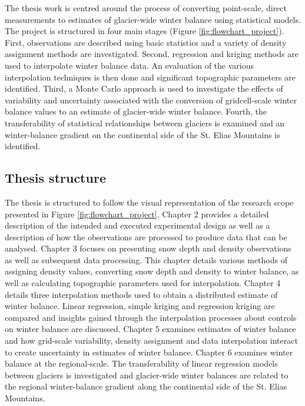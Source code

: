 \documentclass{sfuthesis}
\begin{document}
The thesis work is centred around the process of converting point-scale, direct measurements to estimates of glacier-wide winter balance using statistical models. The project is structured in four main stages (Figure \ref{fig:flowchart_project}). First, observations are described using basic statistics and a variety of density assignment methods are investigated. Second, regression and kriging methods are used to interpolate winter balance data. An evaluation of the various interpolation techniques is then done and significant topographic parameters are identified. Third, a Monte Carlo approach is used to investigate the effects of variability and uncertainty associated with the conversion of gridcell-scale winter balance values to an estimate of glacier-wide winter balance. Fourth, the transferability of statistical relationships between glaciers is examined and an winter-balance gradient on the continental side of the St. Elias Mountains is identified.

\subsection{Thesis structure}
The thesis is structured to follow the visual representation of the research scope presented in Figure \ref{fig:flowchart_project}. Chapter 2 provides a detailed description of the intended and executed experimental design as well as a description of how the observations are processed to produce data that can be analysed. Chapter 3 focuses on presenting snow depth and density observations as well as subsequent data processing. This chapter details various methods of assigning density values, converting snow depth and density to winter balance, as well as calculating topographic parameters used for interpolation. Chapter 4 details three interpolation methods used to obtain a distributed estimate of winter balance. Linear regression, simple kriging and regression kriging are compared and insights gained through the interpolation processes about controls on winter balance are discussed. Chapter 5 examines estimates of winter balance and how grid-scale variability, density assignment and data interpolation interact to create uncertainty in estimates of winter balance. Chapter 6 examines winter balance at the regional-scale. The transferability of linear regression models between glaciers is investigated and glacier-wide winter balances are related to the regional winter-balance gradient along the continental side of the St. Elias Mountains. 
\end{document}
